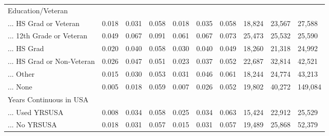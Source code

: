 \documentclass[
  letterpaper,
  DIV=11,
  numbers=noendperiod]{scrartcl}
\begin{document}
\begin{table}[!htbp]
{\begin{tabular}{llllllllll}
Education/Veteran &  &  &  &  &  &  &  &  &  \\ 
... HS Grad or Veteran & 0.018 & 0.031 & 0.058 & 0.018 & 0.035 & 0.058 & 18,824 & 23,567 & 27,588 \\ 
... 12th Grade or Veteran & 0.049 & 0.067 & 0.091 & 0.061 & 0.067 & 0.073 & 25,473 & 25,532 & 25,590 \\ 
... HS Grad & 0.020 & 0.040 & 0.058 & 0.030 & 0.040 & 0.049 & 18,260 & 21,318 & 24,992 \\ 
... HS Grad or Non-Veteran & 0.026 & 0.047 & 0.051 & 0.023 & 0.037 & 0.052 & 22,687 & 32,814 & 42,521 \\ 
... Other & 0.015 & 0.030 & 0.053 & 0.031 & 0.046 & 0.061 & 18,244 & 24,774 & 43,213 \\ 
... None & 0.005 & 0.018 & 0.059 & 0.007 & 0.026 & 0.052 & 19,802 & 40,272 & 149,084 \\ 
Years Continuous in USA &  &  &  &  &  &  &  &  &  \\ 
... Used YRSUSA & 0.008 & 0.034 & 0.058 & 0.025 & 0.034 & 0.063 & 15,424 & 22,912 & 25,529 \\ 
... No YRSUSA & 0.018 & 0.031 & 0.057 & 0.015 & 0.031 & 0.057 & 19,489 & 25,868 & 52,379\\ 
\hline
\hline
\end{tabular}
}
\end{table}
\end{document}
